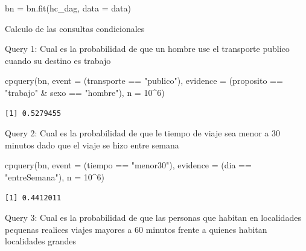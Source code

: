 \documentclass[
  11pt,
  a4paper,
]{article}
\newenvironment{Shaded}{\begin{snugshade}}{\end{snugshade}}
\newcommand{\AttributeTok}[1]{\textcolor[rgb]{0.40,0.45,0.13}{#1}}
\newcommand{\DecValTok}[1]{\textcolor[rgb]{0.68,0.00,0.00}{#1}}
\newcommand{\FunctionTok}[1]{\textcolor[rgb]{0.28,0.35,0.67}{#1}}
\newcommand{\NormalTok}[1]{\textcolor[rgb]{0.00,0.23,0.31}{#1}}
\newcommand{\OtherTok}[1]{\textcolor[rgb]{0.00,0.23,0.31}{#1}}
\newcommand{\SpecialCharTok}[1]{\textcolor[rgb]{0.37,0.37,0.37}{#1}}
\newcommand{\StringTok}[1]{\textcolor[rgb]{0.13,0.47,0.30}{#1}}
\begin{document}
\begin{Shaded}
\begin{Highlighting}[numbers=left,,]
\NormalTok{bn }\OtherTok{=} \FunctionTok{bn.fit}\NormalTok{(hc\_dag, }\AttributeTok{data =}\NormalTok{ data)}
\end{Highlighting}
\end{Shaded}

Calculo de las consultas condicionales

Query 1: Cual es la probabilidad de que un hombre use el transporte
publico cuando su destino es trabajo

\begin{Shaded}
\begin{Highlighting}[numbers=left,,]
\FunctionTok{cpquery}\NormalTok{(bn, }\AttributeTok{event =}\NormalTok{ (transporte }\SpecialCharTok{==} \StringTok{"publico"}\NormalTok{), }\AttributeTok{evidence =}\NormalTok{ (proposito }\SpecialCharTok{==} \StringTok{"trabajo"} \SpecialCharTok{\&}\NormalTok{ sexo }\SpecialCharTok{==} \StringTok{"hombre"}\NormalTok{), }\AttributeTok{n =} \DecValTok{10}\SpecialCharTok{\^{}}\DecValTok{6}\NormalTok{)}
\end{Highlighting}
\end{Shaded}

\begin{verbatim}
[1] 0.5279455
\end{verbatim}

Query 2: Cual es la probabilidad de que le tiempo de viaje sea menor a
30 minutos dado que el viaje se hizo entre semana

\begin{Shaded}
\begin{Highlighting}[numbers=left,,]
\FunctionTok{cpquery}\NormalTok{(bn, }\AttributeTok{event =}\NormalTok{ (tiempo }\SpecialCharTok{==} \StringTok{"menor30"}\NormalTok{), }\AttributeTok{evidence =}\NormalTok{ (dia }\SpecialCharTok{==} \StringTok{"entreSemana"}\NormalTok{), }\AttributeTok{n =} \DecValTok{10}\SpecialCharTok{\^{}}\DecValTok{6}\NormalTok{)}
\end{Highlighting}
\end{Shaded}

\begin{verbatim}
[1] 0.4412011
\end{verbatim}

Query 3: Cual es la probabilidad de que las personas que habitan en
localidades pequenas realices viajes mayores a 60 minutos frente a
quienes habitan localidades grandes
\end{document}

